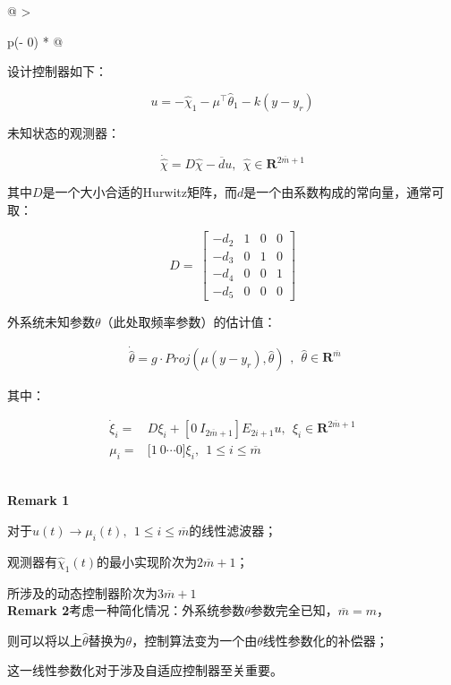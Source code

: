\documentclass[
  12pt,
  a4paper
]{article}
\begin{document}
\begin{longtable}[]{@{}
  >{\raggedright\arraybackslash}p{}@{}}
\toprule\noalign{}
\begin{minipage}[b]{\linewidth}\raggedright
设计控制器如下：

\[u = - {\widehat{\chi}}_{1} - \mu^{\top}{\widehat{\theta}}_{1} - k\left( y - y_{r} \right)\]

未知状态的观测器：

\[\dot{\widehat{\chi}} = D\widehat{\chi} - \overline{d}u,\ \ \widehat{\chi} \in \mathbf{R}^{2\overline{m} + 1}\]

其中\(D\)是一个大小合适的Hurwitz矩阵，而\(d\)是一个由系数构成的常向量，通常可取：

\[D = \ \begin{bmatrix}
 - d_{2} & 1 & 0 & 0 \\
 - d_{3} & 0 & 1 & 0 \\
 - d_{4} & 0 & 0 & 1 \\
 - d_{5} & 0 & 0 & 0
\end{bmatrix}\]

外系统未知参数\(\theta\)（此处取频率参数）的估计值：

\[\begin{array}{r}
\dot{\widehat{\theta}} = g \cdot Proj\left( \mu\left( y - y_{r} \right),\widehat{\theta} \right)
\end{array},\ \ \widehat{\theta} \in \mathbf{R}^{\overline{m}}\]

其中：

\[\begin{aligned}
{\dot{\xi}}_{i} = & D\xi_{i} + \left\lbrack 0\ I_{2\overline{m} + 1} \right\rbrack E_{2i + 1}u,\ \ \xi_{i} \in \mathbf{R}^{2\overline{m} + 1} \\
\mu_{i} = & \lbrack 1\ 0\cdots 0\rbrack\xi_{i},\ \ 1 \leq i \leq \overline{m}
\end{aligned}\]
\end{minipage} \\
\midrule\noalign{}
\endhead
\bottomrule\noalign{}
\endlastfoot
\textbf{Remark 1}

对于\(u(t) \rightarrow \mu_{i}(t),\ \ 1 \leq i \leq \overline{m}\)的线性滤波器；

观测器有\({\widehat{\chi}}_{1}(t)\)的最小实现阶次为\(2\overline{m} + 1\)；

所涉及的动态控制器阶次为\(3\overline{m} + 1\) \\
\textbf{Remark
2}考虑一种简化情况：外系统参数\(\theta\)参数完全已知，\(\overline{m} = m\)，

则可以将以上\(\widehat{\theta}\)替换为\(\theta\)，控制算法变为一个由\(\theta\)线性参数化的补偿器；

这一线性参数化对于涉及自适应控制器至关重要。 \\
\end{longtable}
\end{document}
